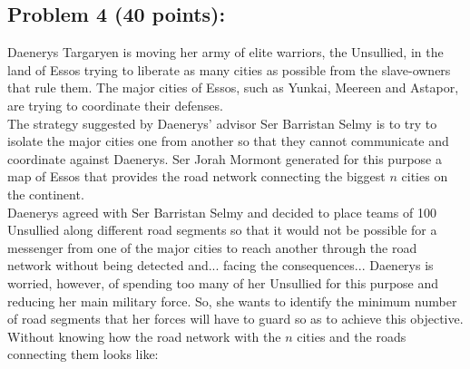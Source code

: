 \documentclass[11pt]{article}
\begin{document}
\subsection*{Problem 4 (40 points):} Daenerys Targaryen is moving
her army of elite warriors, the Unsullied, in the land of Essos trying
to liberate as many cities as possible from the slave-owners that rule
them. The major cities of Essos, such as Yunkai, Meereen and Astapor,
are trying to coordinate their defenses.\\

\noindent The strategy suggested by Daenerys' advisor Ser Barristan
Selmy is to try to isolate the major cities one from another so that
they cannot communicate and coordinate against Daenerys. Ser Jorah
Mormont generated for this purpose a map of Essos that provides the
road network connecting the biggest $n$ cities on the continent.\\

\noindent Daenerys agreed with Ser Barristan Selmy and decided to
place teams of 100 Unsullied along different road segments so that it
would not be possible for a messenger from one of the major cities to
reach another through the road network without being detected
and... facing the consequences...  Daenerys is worried, however, of
spending too many of her Unsullied for this purpose and reducing her
main military force. So, she wants to identify the minimum number of
road segments that her forces will have to guard so as to achieve this
objective.\\

\noindent Without knowing how the road network with the $n$ cities and
the roads connecting them looks like:
\end{document}
